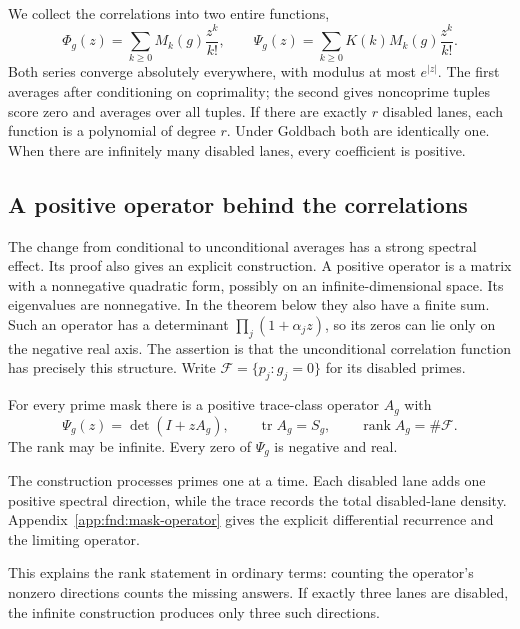 We collect the correlations into two entire functions,
\begin{equation}
 \Phi_g(z)=\sum_{k\ge0}M_k(g)\frac{z^k}{k!},\qquad
 \Psi_g(z)=\sum_{k\ge0}K(k)M_k(g)\frac{z^k}{k!}.
 \label{fnd:two-functions}
\end{equation}
Both series converge absolutely everywhere, with modulus at most
$e^{|z|}$.  The first averages after conditioning on coprimality;
the second gives noncoprime tuples score zero and averages over
all tuples.  If there are exactly $r$ disabled lanes, each function
is a polynomial of degree $r$.  Under Goldbach both are identically
one.  When there are infinitely many disabled lanes, every
coefficient is positive.

\subsection{A positive operator behind the correlations}

The change from conditional to unconditional averages has a strong
spectral effect.  Its proof also gives an explicit construction.
A positive operator is a matrix with a nonnegative quadratic form,
possibly on an infinite-dimensional space. Its eigenvalues are nonnegative.
In the theorem below they also have a finite sum. Such an operator has a
determinant $\prod_j(1+\alpha_j z)$, so its zeros can lie only on the
negative real axis. The assertion is that the unconditional correlation
function has precisely this structure. Write $\mathcal F=\{p_j:g_j=0\}$
for its disabled primes.

\begin{theorem}\label{fnd:mask-operator}
For every prime mask there is a positive trace-class operator $A_g$
with
\begin{equation}
 \Psi_g(z)=\det(I+zA_g),\qquad
 \operatorname{tr}A_g=S_g,\qquad
 \operatorname{rank}A_g=\#\mathcal F.
 \label{fnd:positive-determinant}
\end{equation}
The rank may be infinite.  Every zero of $\Psi_g$ is negative and real.
\end{theorem}
The construction processes primes one at a time. Each disabled lane
adds one positive spectral direction, while the trace records the total
disabled-lane density. Appendix~\ref{app:fnd:mask-operator} gives the
explicit differential recurrence and the limiting operator.

This explains the rank statement in ordinary terms: counting the
operator's nonzero directions counts the missing answers. If exactly
three lanes are disabled, the infinite construction produces only three
such directions.

